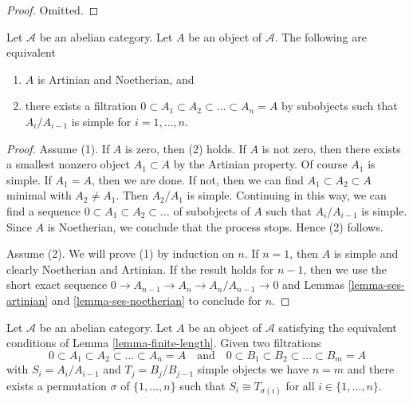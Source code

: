 \begin{proof}
Omitted.
\end{proof}

\begin{lemma}
\label{lemma-finite-length}
Let $\mathcal{A}$ be an abelian category. Let $A$ be an object
of $\mathcal{A}$. The following are equivalent
\begin{enumerate}
\item $A$ is Artinian and Noetherian, and
\item there exists a filtration
$0 \subset A_1 \subset A_2 \subset \ldots \subset A_n = A$
by subobjects such that $A_i/A_{i - 1}$ is simple for $i = 1, \ldots, n$.
\end{enumerate}
\end{lemma}

\begin{proof}
Assume (1). If $A$ is zero, then (2) holds. If $A$ is not zero, then
there exists a smallest nonzero object $A_1 \subset A$ by the Artinian
property. Of course $A_1$ is simple. If $A_1 = A$, then we are done.
If not, then we can find $A_1 \subset A_2 \subset A$ minimal
with $A_2 \not = A_1$. Then $A_2/A_1$ is simple. Continuing in this way, we
can find a sequence $0 \subset A_1 \subset A_2 \subset \ldots $
of subobjects of $A$ such that $A_i/A_{i - 1}$ is simple. Since $A$
is Noetherian, we conclude that the process stops. Hence (2) follows.

\medskip\noindent
Assume (2). We will prove (1) by induction on $n$. If $n = 1$, then
$A$ is simple and clearly Noetherian and Artinian. If the result holds
for $n - 1$, then we use the short exact sequence
$0 \to A_{n - 1} \to A_n \to A_n/A_{n - 1} \to 0$
and Lemmas \ref{lemma-ses-artinian} and \ref{lemma-ses-noetherian}
to conclude for $n$.
\end{proof}

\begin{lemma}
\label{lemma-jordan-holder}
Let $\mathcal{A}$ be an abelian category. Let $A$ be an object
of $\mathcal{A}$ satisfying the equivalent conditions of
Lemma \ref{lemma-finite-length}. Given two filtrations
$$
0 \subset A_1 \subset A_2 \subset \ldots \subset A_n = A
\quad\text{and}\quad
0 \subset B_1 \subset B_2 \subset \ldots \subset B_m = A
$$
with $S_i = A_i/A_{i - 1}$ and $T_j = B_j/B_{j - 1}$ simple objects we have
$n = m$ and there exists a permutation $\sigma$ of $\{1, \ldots, n\}$
such that $S_i \cong T_{\sigma(i)}$ for all $i \in \{1, \ldots, n\}$.
\end{lemma}


